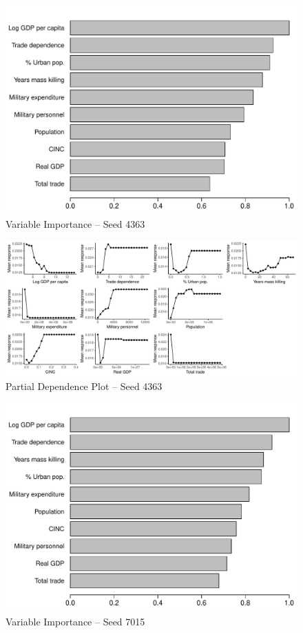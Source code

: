 \documentclass[a4paper,12pt]{article}
\begin{document}
\begin{figure}[H]
    \centering
    \includegraphics{images/rf-mk-4363.pdf}
    \caption{Variable Importance -- Seed 4363}
    \label{fig:rf-mk-4363}
\end{figure}

\newpage

\begin{figure}[H]
    \centering
    \includegraphics[width=.98\textheight,angle=90]{images/rf-mk-4363-pd.pdf}
    \caption{Partial Dependence Plot -- Seed 4363}
    \label{fig:rf-mk-4363}
\end{figure}

\newpage

\begin{figure}[H]
    \centering
    \includegraphics{images/rf-mk-7015.pdf}
    \caption{Variable Importance -- Seed 7015}
    \label{fig:rf-mk-4363}
\end{figure}
\end{document}
